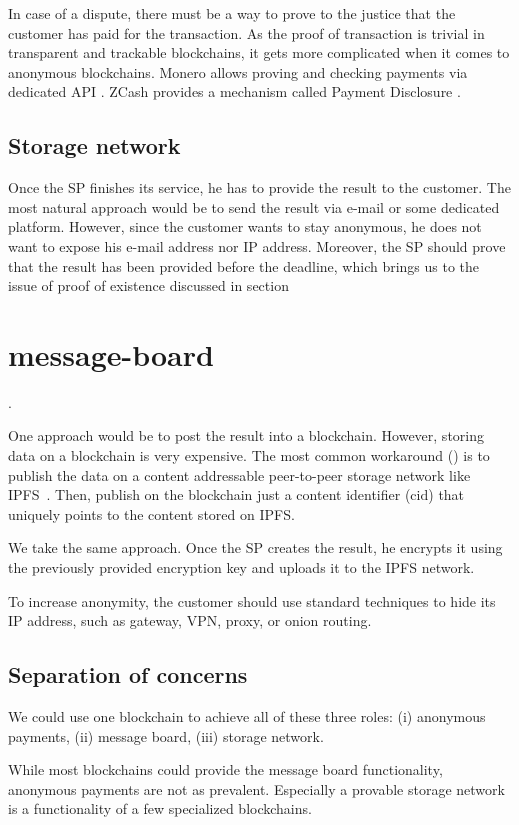\documentclass{ieeeaccess}
\begin{document}
In case of a dispute, there must be a way to prove to the justice that the customer has paid for the transaction. As the proof of transaction is trivial in transparent and trackable blockchains, it gets more complicated when it comes to anonymous blockchains. Monero allows proving and checking payments via dedicated API \cite{Howtopro46}. ZCash provides a mechanism called Payment Disclosure \cite{AnIntrod25}.

\subsection{Storage network}\label{storage-network}
Once the SP finishes its service, he has to provide the result to the customer. The most natural approach would be to send the result via e-mail or some dedicated platform. However, since the customer wants to stay anonymous, he does not want to expose his e-mail address nor IP address. Moreover, the SP should prove that the result has been provided before the deadline, which brings us to the issue of proof of existence discussed in section ~\section{message-board}.

One approach would be to post the result into a blockchain. However, storing data on a blockchain is very expensive. The most common workaround (\cite{shahid2020blockchain, wang2019auditable, chen2017improved, Usageide95}) is to publish the data on a content addressable peer-to-peer storage network like IPFS~\cite{benet2014ipfs}. Then, publish on the blockchain just a content identifier ($\mathrm{cid}$) that uniquely points to the content stored on IPFS.

We take the same approach. Once the SP creates the result, he encrypts it using the previously provided encryption key and uploads it to the IPFS network.

To increase anonymity, the customer should use standard techniques to hide its IP address, such as gateway, VPN, proxy, or onion routing.

\subsection{Separation of concerns}
We could use one blockchain to achieve all of these three roles: (i) anonymous payments, (ii) message board, (iii) storage network.

While most blockchains could provide the message board functionality, anonymous payments are not as prevalent. Especially a provable storage network is a functionality of a few specialized blockchains.
\end{document}
